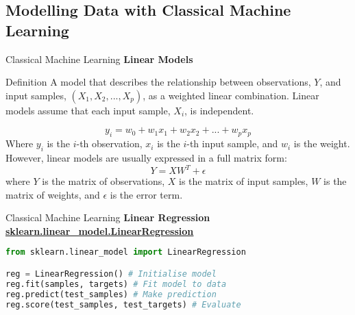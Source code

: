\documentclass{beamer}
\begin{document}
\subsection{Modelling Data with Classical Machine Learning}
\begin{frame}[fragile]{Classical Machine Learning}
    \vspace{-0.5cm}
    \textbf{Linear Models}
    \begin{block}{Definition}
        A model that describes the relationship between observations, $Y$, and input samples, $(X_1, X_2,..., X_p)$, as a weighted linear combination. Linear models assume that each input sample, $X_i$, is independent.
    \end{block}
    \vspace{-1cm}
    \begin{equation}
        y_i = w_0 + w_1 x_1 + w_2 x_2 + ... + w_p x_p
    \end{equation}
    Where $y_i$ is the $i$-th observation, $x_i$ is the $i$-th input sample, and $w_i$ is the weight.
    However, linear models are usually expressed in a full matrix form:
    \begin{equation}
        \label{eq:2}
        Y = XW^T + \epsilon
    \end{equation}
    where $Y$ is the matrix of observations, $X$ is the matrix of input samples, $W$ is the matrix of weights, and $\epsilon$ is the error term.
\end{frame}
\begin{frame}[fragile]{Classical Machine Learning}
    \textbf{Linear Regression}
    \href{https://scikit-learn.org/stable/modules/generated/sklearn.linear_model.LinearRegression.html}{\textbf{\underline{sklearn.linear\_model.LinearRegression}}}
    \begin{example}
        \begin{lstlisting}[language=Python]
from sklearn.linear_model import LinearRegression

reg = LinearRegression() # Initialise model
reg.fit(samples, targets) # Fit model to data
reg.predict(test_samples) # Make prediction
reg.score(test_samples, test_targets) # Evaluate
        \end{lstlisting}
    \end{example}
\end{frame}
\end{document}
